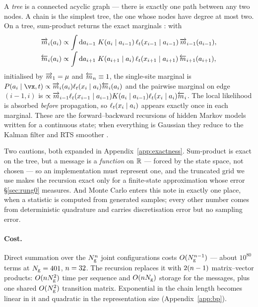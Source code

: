 \documentclass{article}
\begin{document}
A \emph{tree} is a connected acyclic graph --- there is exactly one path between any two nodes. A
chain is the simplest tree, the one whose nodes have degree at most two. On a tree, sum-product
returns the exact marginals \citep{pearl1988,kschischang2001,mezard2009}: with
\begin{align}
\label{eq:messages}
\overrightarrow{m}_{i}(a_i) &\propto \int \mathrm{d}a_{i-1}\;
K(a_i\mid a_{i-1})\,\ell_t(x_{i-1}\mid a_{i-1})\,\overrightarrow{m}_{i-1}(a_{i-1}), \nonumber\\[-2pt]
\overleftarrow{m}_{i}(a_i) &\propto \int \mathrm{d}a_{i+1}\;
K(a_{i+1}\mid a_i)\,\ell_t(x_{i+1}\mid a_{i+1})\,\overleftarrow{m}_{i+1}(a_{i+1}),
\end{align}
initialised by $\overrightarrow{m}_1 = \mu$ and $\overleftarrow{m}_{n}\equiv 1$, the single-site marginal is
$P(a_i\mid \vx,t) \propto \lmsg_i(a_i)\like(x_i\mid a_i)\rmsg_i(a_i)$ and the pairwise marginal on
edge $(i-1,i)$ is $\propto \overrightarrow{m}_{i-1}\ell_t(x_{i-1}\mid a_{i-1})K(a_i\mid
a_{i-1})\ell_t(x_i\mid a_i)\overleftarrow{m}_i$. The local likelihood is absorbed \emph{before} propagation, so
$\ell_t(x_i\mid a_i)$ appears exactly once in each marginal. These are the forward--backward
recursions of hidden Markov models \citep{baum1970,rabiner1989} written for a continuous state;
when everything is Gaussian they reduce to the Kalman filter and RTS smoother
\citep{kalman1960,rauch1965}.


Two cautions, both expanded in Appendix~\ref{app:exactness}. Sum-product is exact on the tree,
but a message is a \emph{function} on $\mathbb{R}$ --- forced by the state space, not chosen --- so an
implementation must represent one, and the truncated grid we use makes the recursion exact only
for a finite-state approximation whose error \S\ref{sec:rung0} measures. And Monte Carlo enters
this note in exactly one place, when a statistic is computed from generated samples; every other
number comes from deterministic quadrature and carries discretisation error but no sampling error.

\paragraph{Cost.} Direct summation over the $N_{\mathrm{g}}^{n}$ joint configurations costs
$O(N_{\mathrm{g}}^{n-1})$ --- about $10^{80}$ terms at $N_{\mathrm{g}}=401$, $n=32$. The recursion
replaces it with $2(n-1)$ matrix--vector products: $O(nN_{\mathrm{g}}^{2})$ time per sequence
and $O(nN_{\mathrm{g}})$ storage for the messages, plus one shared $O(N_{\mathrm{g}}^{2})$ transition
matrix. Exponential in the chain length becomes linear in it and quadratic in the representation
size (Appendix~\ref{app:bp}).
\end{document}
